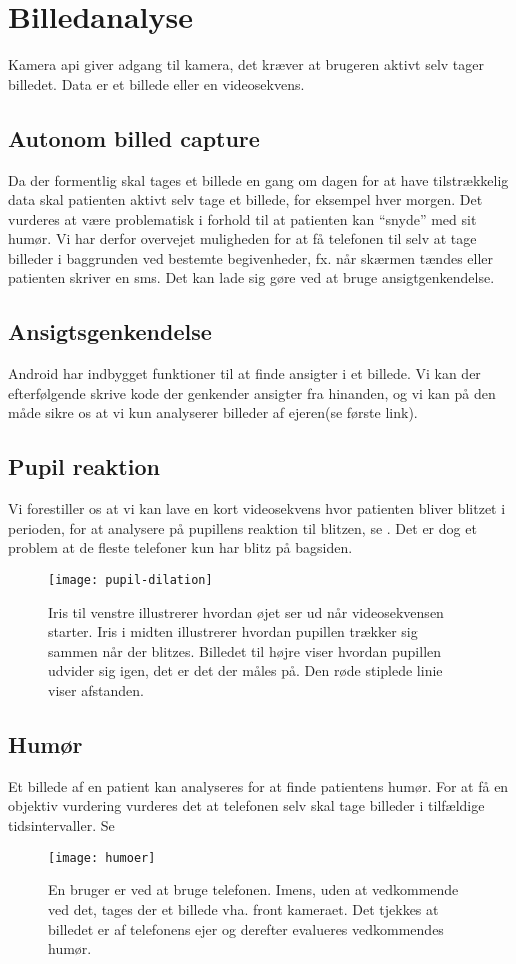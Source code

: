 \section{Billedanalyse}
Kamera api giver adgang til kamera, det kræver at brugeren aktivt selv tager billedet. Data er et billede eller en videosekvens.

\subsection{Autonom billed capture}
Da der formentlig skal tages et billede en gang om dagen for at have tilstrækkelig data skal patienten aktivt selv tage et billede, for eksempel hver morgen.
Det vurderes at være problematisk i forhold til at patienten kan ``snyde'' med sit humør.
Vi har derfor overvejet muligheden for at få telefonen til selv at tage billeder i baggrunden ved bestemte begivenheder, fx. når skærmen tændes eller patienten skriver en sms.
Det kan lade sig gøre ved at bruge ansigtgenkendelse.

\subsection{Ansigtsgenkendelse}
Android har indbygget funktioner til at finde ansigter i et billede. 
Vi kan der efterfølgende skrive kode der genkender ansigter fra hinanden, og vi kan på den måde sikre os at vi kun analyserer billeder af ejeren(se første link).

\subsection{Pupil reaktion}
Vi forestiller os at vi kan lave en kort videosekvens hvor patienten bliver blitzet i perioden, for at analysere på pupillens reaktion til blitzen, se \cite{hoeks1993pupillary}.
Det er dog et problem at de fleste telefoner kun har blitz på bagsiden.
\begin{figure}
	\centering
\texttt{[image: pupil-dilation]}
\caption{Iris til venstre illustrerer hvordan øjet ser ud når videosekvensen starter. Iris i midten illustrerer hvordan pupillen trækker sig sammen når der blitzes. Billedet til højre viser hvordan pupillen udvider sig igen, det er det der måles på. Den røde stiplede linie viser afstanden.}
\end{figure}

\subsection{Humør}

Et billede af en patient kan analyseres for at finde patientens humør. 
For at få en objektiv vurdering vurderes det at telefonen selv skal tage billeder i tilfældige tidsintervaller. 
Se \cite{kulkarni2009facial}
\begin{figure}
	\centering
\texttt{[image: humoer]}
\caption{En bruger er ved at bruge telefonen. Imens, uden at vedkommende ved det, tages der et billede vha. front kameraet. Det tjekkes at billedet er af telefonens ejer og derefter evalueres vedkommendes humør.}
\end{figure}